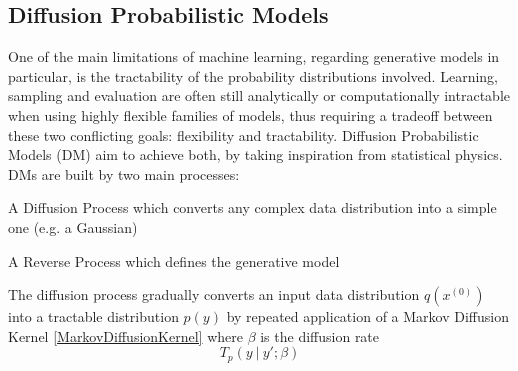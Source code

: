 \documentclass[conference]{IEEEtran}
\begin{document}
\subsection{Diffusion Probabilistic Models}
One of the main limitations of machine learning, regarding generative models in particular, is the tractability of the probability distributions involved. Learning, sampling and evaluation are often still analytically or computationally intractable when using highly flexible families of models, thus requiring a tradeoff between these two conflicting goals: flexibility and tractability. Diffusion Probabilistic Models (DM) \cite{diffusionmodels} aim to achieve both, by taking inspiration from statistical physics.\\
DMs are built by two main processes:
\begin{list}{-}{}
	\item A Diffusion Process which converts any complex data distribution into a simple one (e.g. a Gaussian)
	\item A Reverse Process which defines the generative model
\end{list}
The diffusion process gradually converts an input data distribution $q(x^{(0)})$ into a tractable distribution $p(y)$ by repeated application of a Markov Diffusion Kernel \eqref{MarkovDiffusionKernel} where $\beta$ is the diffusion rate
\begin{equation}
T_p(y\:|\:y';\beta)
\label{MarkovDiffusionKernel}
\end{equation}
\end{document}
